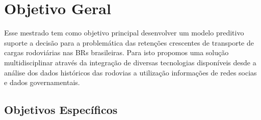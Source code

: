 \section{ Objetivo Geral}\label{intro:objetivo}

Esse mestrado tem como objetivo principal desenvolver um modelo preditivo suporte a decisão para a problemática das retenções crescentes de transporte de cargas rodoviárias 
nas BRs brasileiras. Para isto propomos uma solução multidisciplinar através da integração de diversas tecnologias disponíveis desde a análise dos dados históricos das 
rodovias a utilização informações de redes socias e dados governamentais.

\subsection{ Objetivos Específicos}\label{intro:especificos}

